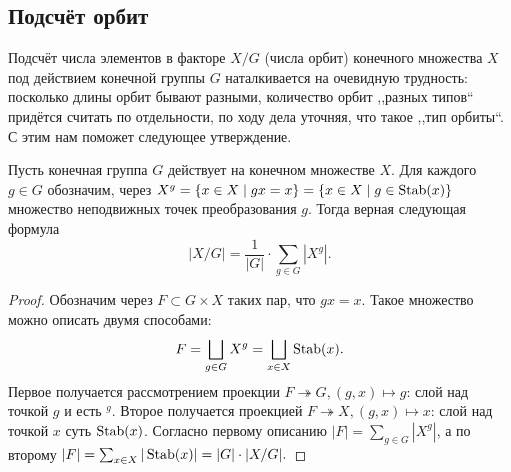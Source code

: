 \subsection{Подсчёт орбит}
Подсчёт числа элементов в факторе $X/G$ (числа орбит) конечного множества $X$ под действием конечной группы $G$ наталкивается на очевидную трудность: посколько длины орбит бывают разными, количество орбит ,,разных типов`` придётся считать по отдельности, по ходу дела уточняя, что такое ,,тип орбиты``. С этим нам поможет следующее утверждение. 
\begin{theorem}\label{th:burnside}
    Пусть конечная группа $G$ действует на конечном множестве $X$. Для каждого $g \in G$ обозначим, через $X^g = \{x \in X \mid gx = x\} = \{x \in X \mid g \in \operatorname{Stab}(x)\}$ множество неподвижных точек преобразования $g$. Тогда верная следующая формула \[
        |X/G| = \frac{1}{|G|}\cdot \sum_{g \in G} |X^g|.
    \]
\end{theorem}
\begin{proof}
    Обозначим через $F \subset G \times X$ таких пар, что $gx = x$. Такое множество можно описать двумя способами: 
    \[
        F = \bigsqcup_{g\in G} X^g = \bigsqcup_{x \in X} \operatorname{Stab}(x).
    \]
    Первое получается рассмотрением проекции $F \twoheadrightarrow G, (g, x) \mapsto g$: слой над точкой $g$ и есть $^g$. Второе получается проекцией $F \twoheadrightarrow X, (g, x)\mapsto x$: слой над точкой $x$ суть $\operatorname{Stab}(x)$. Согласно первому описанию $|F| = \sum_{g \in G} |X^g|$, а по второму $|F| = \sum_{x \in X} |\operatorname{Stab}(x)| = |G| \cdot |X/G|.$
\end{proof}

